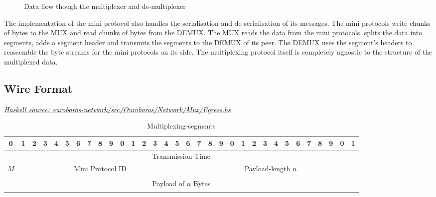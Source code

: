 \documentclass{report}
\newcommand{\hsref}[1]{\href{https://github.com/input-output-hk/ouroboros-network/blob/master/#1}{\emph{Haskell source: #1}}}
\theoremstyle{definition}{
  \newtheorem{lemma}{Lemma}[section] %
  \newtheorem{definition}[lemma]{Definition}
}
\theoremstyle{theorem}{
  \newtheorem{invariant}[lemma]{Invariant}
  \newtheorem{proofobligation}[lemma]{Proof Obligation}
}
\numberwithin{equation}{lemma}
\begin{document}
\begin{figure}[ht]
\begin{center}
\end{center}
\caption{Data flow though the multiplexer and de-multiplexer}
\label{mux-diagram}
\end{figure}

The implementation of the mini protocol also handles the serialisation and de-serialisation of its messages.
The mini protocols write chunks of bytes to the MUX and read chunks of bytes from the DEMUX.
The MUX reads the data from the mini protocols, splits the data into segments, adds a segment header
and transmits the segments to the DEMUX of its peer.
The DEMUX uses the segment's headers to reassemble the byte streams for the mini protocols on its side.
The multiplexing protocol itself is completely agnostic to the structure of the multiplexed data.

\subsection{Wire Format}
\hsref{ouroboros-network/src/Ouroboros/Network/Mux/Egress.hs}
\begin{table}[h]
\centering
\begingroup
\setlength{\tabcolsep}{3pt}
\begin{tabular}{|c|c|c|c|c|c|c|c|c|c|c|c|c|c|c|c|c|c|c|c|c|c|c|c|c|c|c|c|c|c|c|c|}
  \hline
  0&1&2&3&4&5&6&7&8&9&0&1&2&3&4&5&6&7&8&9&0&1&2&3&4&5&6&7&8&9&0&1 \\ \hline
  \multicolumn{32}{|c|}{Transmission Time} \\ \hline
  \multicolumn{1}{|c|}{$M$}
  &\multicolumn{15}{|c|}{Mini Protocol ID}
  &\multicolumn{16}{|c|}{Payload-length $n$} \\ \hline
  \multicolumn{32}{|c|}{} \\
  \multicolumn{32}{|c|}{Payload of $n$ Bytes} \\
  \multicolumn{32}{|c|}{} \\ \hline
\end{tabular}
\endgroup
\caption{Multiplexing-segments}
\label{segment-header}
\end{table}
\end{document}
